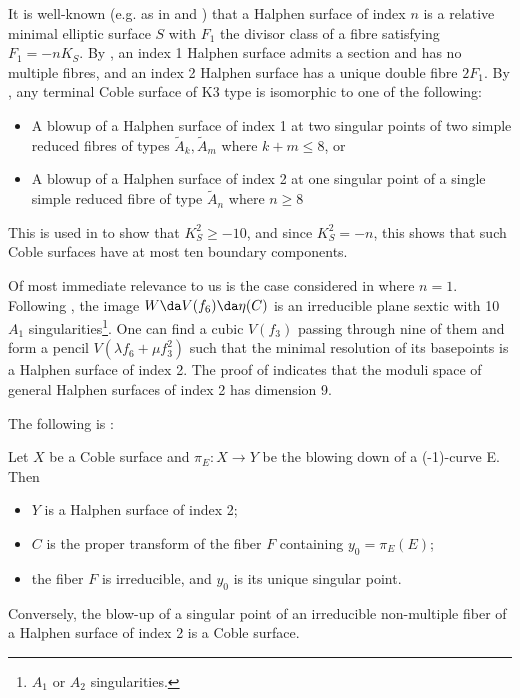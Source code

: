 \documentclass[../main.tex]{subfiles}
\begin{document}
\begin{remark}
It is well-known (e.g. as in \cite{DZ99} and \cite[Ch.5 \S 6]{CD12}) that a Halphen surface of index $n$ is a relative minimal elliptic surface $S$ with $F_1$ the divisor class of a fibre satisfying $F_1 = -n K_S$. By \cite[\S 2.4]{DZ99}, an index 1 Halphen surface admits a section and has no multiple fibres, and an index 2 Halphen surface has a unique double fibre $2F_1$.
By \cite[Prop. 9.1.4]{DK24}, any terminal Coble surface of K3 type is isomorphic to one of the following:

\begin{itemize}
    \item A blowup of a Halphen surface of index 1 at two singular points of two simple reduced fibres of types $\tilde A_k, \tilde A_m$ where $k+m\leq 8$, or
    \item A blowup of a Halphen surface of index 2 at one singular point of a single simple reduced fibre of type $\tilde A_n$ where $n\geq 8$
\end{itemize}
This is used in \cite[Prop. 9.1.5]{DK24} to show that $K_S^2 \geq -10$, and since $K_S^2 = -n$, this shows that such Coble surfaces have at most ten boundary components.

Of most immediate relevance to us is the case considered in \cite{Cob19} where $n=1$. Following \cite[Ex. 9.1.7]{DK24}, the image $W \da V(f_6) \da \eta(C)$ is an irreducible plane sextic with 10 $A_1$ singularities\footnote{$A_1$ or $A_2$ singularities.}. One can find a cubic $V(f_3)$ passing through nine of them and form a pencil $V(\lambda f_6 + \mu f_3^2)$ such that the minimal resolution of its basepoints is a Halphen surface of index 2. The proof of \cite[Prop. 9.1.8]{DK24} indicates that the moduli space of general Halphen surfaces of index 2 has dimension 9.
\end{remark}


The following is \cite[Prop. \, 3.1]{CD12}:

\begin{lemma}\label{lem:coble_halphen_blowdown}
Let $X$ be a Coble surface and $\pi_{E}: X \rightarrow Y$ be the blowing down of a (-1)-curve E. Then

\begin{itemize}
    \item $Y$ is a Halphen surface of index 2;
    \item $C$ is the proper transform of the fiber $F$ containing $y_{0}=\pi_{E}(E)$;
    \item the fiber $F$ is irreducible, and $y_{0}$ is its unique singular point.
\end{itemize}
Conversely, the blow-up of a singular point of an irreducible non-multiple fiber of a Halphen surface of index 2 is a Coble surface.
\end{lemma}
\end{document}
